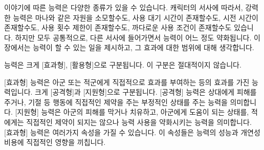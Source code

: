 \documentclass{report}
\begin{document}
	이야기에 따른 능력은 다양한 종류가 있을 수 있습니다.
	캐릭터의 서사에 따라서, 강력한 능력은 마나와 같은 자원을 소모할수도, 사용 대기 시간이 존재할수도, 시전 시간이 존재할수도, 사용 횟수 제한이 존재할수도, 까다로운 사용 조건이 존재할수도 있습니다. 하지만 모두 공통적으로, 다른 서사에 들어가면서 능력이 어느 정도 약화됩니다.
	이 장에서는 능력이 할 수 있는 일을 제시하고, 그 효과에 대한 범위에 대해 생각합니다.
	
	능력은 크게 [효과형], [활용형]으로 구분됩니다. 이 구분은 절대적이지 않습니다.
	
	[효과형] 능력은 아군 또는 적군에게 직접적으로 효과를 부여하는 등의 효과를 가진 능력입니다. 크게 [공격형]과 [지원형]으로 구분됩니다.
	[공격형] 능력은 상대에게 피해를 주거나, 기절 등 행동에 직접적인 제약을 주는 부정적인 상태를 주는 능력을 의미합니다.
	[지원형] 능력은 아군의 피해를 막거나 치유하고, 아군에게 도움이 되는 상태를, 적에게는 직접적인 제약이 되지는 않으나 능력 사용을 약화시키는 능력을 의미합니다.
	[효과형] 능력은 여러가지 속성을 가질 수 있습니다. 이 속성들은 능력의 성능과 개연성 비용에 직접적인 영향을 끼칩니다.
	
\end{document}
